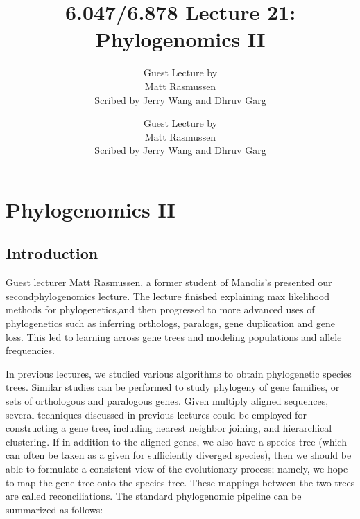 \ifdefined\isstandalone
\title{6.047/6.878 Lecture 21: Phylogenomics II {\tmabbr{}}}
\author{Guest Lecture by\\
  Matt Rasmussen \\
  Scribed by Jerry Wang and Dhruv Garg}
\maketitle
{}
\lhead{}
\rhead{}
{\pagebreak}
{\tableofcontents}
{\pagebreak}
{\listoffigures}
\else
\chapter{Phylogenomics II}
\author{Guest Lecture by\\
  Matt Rasmussen \\
  Scribed by Jerry Wang and Dhruv Garg}
\lhead{} 
\rhead{} 
\minilof
\fi 
\pagestyle{fancy} 

\ifdefined\isstandalone
\def\@mydir{images} 
\fi
\ifdefined\ischapter
\def\@mydir{../Lecture21_Phylogenomics/images} 
\fi 
\ifdefined\ismaster
\def\@mydir{Lecture21_Phylogenomics/images} 
\fi 
\section{Introduction}

Guest lecturer Matt Rasmussen, a former student of Manolis’s presented
our secondphylogenomics lecture. The lecture finished explaining max
likelihood methods for phylogenetics,and then progressed to more
advanced uses of phylogenetics such as inferring orthologs, paralogs,
gene duplication and gene loss. This led to learning across gene trees
and modeling populations and allele frequencies.

In previous lectures, we studied various algorithms to obtain
phylogenetic species trees. Similar studies can be performed to study
phylogeny of gene families, or sets of orthologous and paralogous
genes. Given multiply aligned sequences, several techniques discussed
in previous lectures could be employed for constructing a gene tree,
including nearest neighbor joining, and hierarchical clustering. If in
addition to the aligned genes, we also have a species tree (which can
often be taken as a given for sufficiently diverged species), then we
should be able to formulate a consistent view of the evolutionary
process; namely, we hope to map the gene tree onto the species
tree. These mappings between the two trees are called
reconciliations. The standard phylogenomic pipeline can be summarized
as follows:

